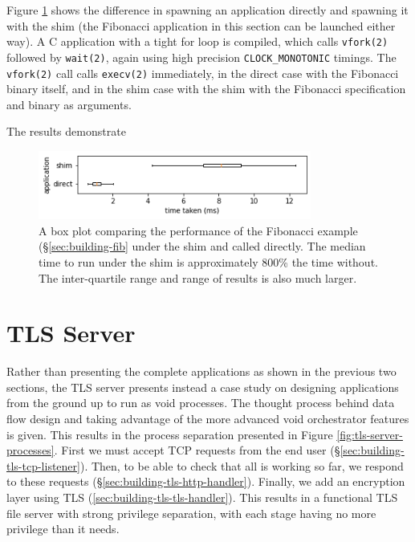 \documentclass[12pt,a4paper,twoside]{report}
\begin{document}
Figure \ref{fig:fib-launch-times} shows the difference in spawning an application directly and spawning it with the shim (the Fibonacci application in this section can be launched either way). A C application with a tight for loop is compiled, which calls \texttt{vfork(2)} followed by \texttt{wait(2)}, again using high precision \texttt{CLOCK\_MONOTONIC} timings. The \texttt{vfork(2)} call calls \texttt{execv(2)} immediately, in the direct case with the Fibonacci binary itself, and in the shim case with the shim with the Fibonacci specification and binary as arguments.

The results demonstrate 

\begin{figure}
    \centering
    \includegraphics[width=0.8\textwidth]{graphs/fib_launch_times.png}

    \caption{A box plot comparing the performance of the Fibonacci example (§\ref{sec:building-fib} under the shim and called directly. The median time to run under the shim is approximately 800\% the time without. The inter-quartile range and range of results is also much larger.}
    \label{fig:fib-launch-times}
\end{figure}

\section{TLS Server}
\label{sec:building-tls}

Rather than presenting the complete applications as shown in the previous two sections, the TLS server presents instead a case study on designing applications from the ground up to run as void processes. The thought process behind data flow design and taking advantage of the more advanced void orchestrator features is given. This results in the process separation presented in Figure \ref{fig:tls-server-processes}. First we must accept TCP requests from the end user (§\ref{sec:building-tls-tcp-listener}). Then, to be able to check that all is working so far, we respond to these requests (§\ref{sec:building-tls-http-handler}). Finally, we add an encryption layer using TLS (\ref{sec:building-tls-tls-handler}). This results in a functional TLS file server with strong privilege separation, with each stage having no more privilege than it needs.
\end{document}
